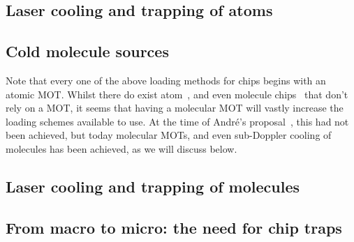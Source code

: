\subsection{Laser cooling and trapping of atoms}

\subsection{Cold molecule sources}
\label{intro:moleculesources}

Note that every one  of the above loading methods for
chips begins with an atomic MOT. Whilst there do exist atom~\cite{Dekker2000},
and even molecule chips~\cite{Bethlem2000. Meek2008} that don't rely on a MOT,
it seems that having a molecular MOT will vastly increase the loading schemes
available to use. At the time of Andr\'e's proposal~\cite{Andre2006}, this had
not been achieved, but today molecular MOTs, and even sub-Doppler cooling of
molecules has been achieved, as we will discuss below.

\subsection{Laser cooling and trapping of molecules}

\subsection{From macro to micro: the need for chip traps}
